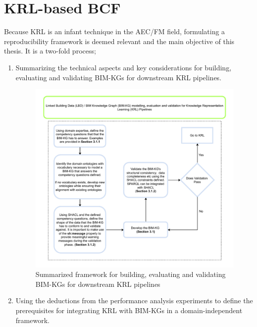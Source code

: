 \section{\acf{KRL-based BCF}}
\label{KRL-based BCF}
Because \ac{KRL} is an infant technique in the \ac{AEC/FM} field, formulating a reproducibility framework is deemed relevant and the main objective of this thesis. It is a two-fold process;
\begin{enumerate}
    \item 
    Summarizing the technical aspects and key considerations for building, evaluating and validating \acp{BIM-KG} for downstream \ac{KRL} pipelines.

    \begin{figure}[h]
    \centering
    \includegraphics[width=1\textwidth]{figures/lbd_for_krl.pdf}
    \caption{Summarized framework for building, evaluating and validating \acp{BIM-KG} for downstream \ac{KRL} pipelines}\label{SSN_OPM_SEAS}
\end{figure}

    \item 
    Using the deductions from the performance analysis experiments to define the prerequisites for integrating \ac{KRL} with \acp{BIM-KG} in a domain-independent framework.   
\end{enumerate}
